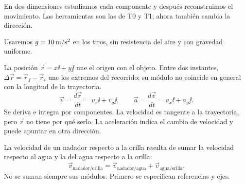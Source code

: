 \documentclass[11pt,a4paper]{article}
\begin{document}
\shorthandoff{<>}
\color{Ink}
En dos dimensiones estudiamos cada componente y despu\'es reconstruimos el
movimiento. Las herramientas son las de T0 y T1; ahora tambi\'en cambia la direcci\'on.
\begin{lessonindex}
\end{lessonindex}
Usaremos $g=10\,\mathrm{m/s^2}$ en los tiros, sin resistencia del aire y con gravedad uniforme.
\precisionnote

La posici\'on $\vec r=x\ii+y\jj$ une el origen con el objeto.
Entre dos instantes, $\Delta\vec r=\vec r_f-\vec r_i$ une los extremos del recorrido;
su m\'odulo no coincide en general con la longitud de la trayectoria.
\[
\vec v=\frac{d\vec r}{dt}=v_x\ii+v_y\jj,\qquad
\vec a=\frac{d\vec v}{dt}=a_x\ii+a_y\jj.
\]
Se deriva e integra por componentes. La velocidad es tangente a la trayectoria,
pero $\vec r$ no tiene por qu\'e serlo. La aceleraci\'on indica el cambio de
velocidad y puede apuntar en otra direcci\'on.

La velocidad de un nadador respecto a la orilla resulta de sumar la velocidad
respecto al agua y la del agua respecto a la orilla:
\[
\vec v_{\mathrm{nadador/orilla}}
=\vec v_{\mathrm{nadador/agua}}+\vec v_{\mathrm{agua/orilla}}.
\]
No se suman siempre sus m\'odulos. Primero se especifican referencias y ejes.
\end{document}
